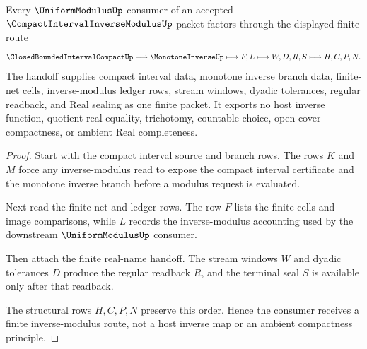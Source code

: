 \begin{theorem}
\label{thm:compact-interval-inverse-modulus-finite-net-handoff}
Every $\UniformModulusUp$ consumer of an accepted $\CompactIntervalInverseModulusUp$ packet factors through the displayed finite route
$$
\ClosedBoundedIntervalCompactUp
\longmapsto
\MonotoneInverseUp
\longmapsto
F,L
\longmapsto
W,D,R,S
\longmapsto
H,C,P,N .
$$
The handoff supplies compact interval data, monotone inverse branch data, finite-net cells, inverse-modulus ledger rows, stream windows, dyadic tolerances, regular readback, and Real sealing as one finite packet. It exports no host inverse function, quotient real equality, trichotomy, countable choice, open-cover compactness, or ambient Real completeness.
\end{theorem}
\begin{proof}
Start with the compact interval source and branch rows. The rows $K$ and $M$ force any inverse-modulus read to expose the compact interval certificate and the monotone inverse branch before a modulus request is evaluated.

Next read the finite-net and ledger rows. The row $F$ lists the finite cells and image comparisons, while $L$ records the inverse-modulus accounting used by the downstream $\UniformModulusUp$ consumer.

Then attach the finite real-name handoff. The stream windows $W$ and dyadic tolerances $D$ produce the regular readback $R$, and the terminal seal $S$ is available only after that readback.

The structural rows $H,C,P,N$ preserve this order. Hence the consumer receives a finite inverse-modulus route, not a host inverse map or an ambient compactness principle.
\end{proof}


